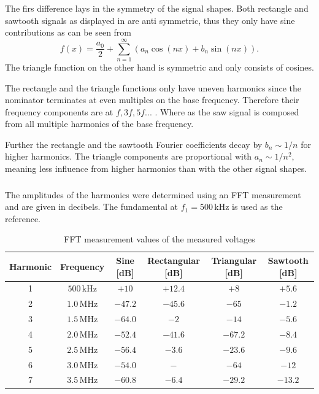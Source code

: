 \documentclass[a4paper,12pt]{article}
\begin{document}
	The firs difference lays in the symmetry of the signal shapes. Both rectangle and sawtooth signals as displayed in \cite{matheonline_fourier_tutorial} are anti symmetric, thus they only have sine contributions as can be seen from 
	\[
	f(x) = \frac{a_0}{2} + \sum_{n=1}^\infty \left( a_n \cos(nx) + b_n \sin(nx) \right).
	\]
	The triangle function on the other hand is symmetric and only consists of cosines.
	
	The rectangle and the triangle functions only have uneven harmonics since the nominator terminates at even multiples on the base frequency. Therefore their frequency components are at $f, 3f, 5f ...$ . Where as the saw signal is composed from all multiple harmonics of the base frequency. 
	
	Further the rectangle and the sawtooth Fourier coefficients decay by $b_n\sim 1/n$ for higher harmonics. The triangle components are proportional with $a_n\sim 1/n^2$, meaning less influence from higher harmonics than with the other signal shapes.
	
	\subsubsection{}
	
	The amplitudes of the harmonics were determined using an FFT measurement and are
	given in decibels. The fundamental at \(f_1 = 500\,\mathrm{kHz}\) is used as the
	reference.
	
	\begin{table}[h]
		\centering		
		\caption{FFT measurement values of the measured voltages}
		\label{tab:fft}
		\begin{tabular}{c c c c c c}
			\hline
			Harmonic & Frequency & Sine [dB] & Rectangular [dB] & Triangular [dB] & Sawtooth [dB] \\
			\hline
			1 & \(500\,\mathrm{kHz}\) & \(+10\) & \(+12.4\) & \(+8\) & \(+5.6\) \\
			2 & \(1.0\,\mathrm{MHz}\) & \(-47.2\) & \(-45.6\) & \(-65\) & \(-1.2\) \\
			3 & \(1.5\,\mathrm{MHz}\) & \(-64.0\) & \(-2\) & \(-14\) & \(-5.6\) \\
			4 & \(2.0\,\mathrm{MHz}\) & \(-52.4\) & \(-41.6\) & \(-67.2\) & \(-8.4\) \\
			5 & \(2.5\,\mathrm{MHz}\) & \(-56.4\) & \(-3.6\) & \(-23.6\) & \(-9.6\) \\
			6 & \(3.0\,\mathrm{MHz}\) & \(-54.0\) & \(-\) & \(-64\) & \(-12\) \\
			7 & \(3.5\,\mathrm{MHz}\) & \(-60.8\) & \(-6.4\) & \(-29.2\) & \(-13.2\) \\
			\hline
		\end{tabular}

	\end{table}
	
\end{document}
